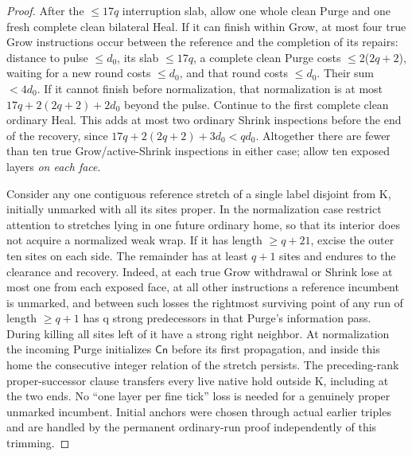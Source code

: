 \begin{proof}
After the \(\le\)\(17q\) interruption slab, allow one whole clean Purge and one fresh complete clean bilateral Heal. If it can finish within Grow, at most four true Grow instructions occur between the reference and the completion of its repairs: distance to pulse \(\le\)\(d_0\), its slab \(\le\)\(17q\), a complete clean Purge costs \(\le\)2(\(2q+2\)), waiting for a new round costs \(\le\)\(d_0\), and that round costs \(\le\)\(d_0\). Their sum \(<4d_0\). If it cannot finish before normalization, that normalization is at most \(17q+2(2q+2)+2d_0\) beyond the pulse. Continue to the first complete clean ordinary Heal. This adds at most two ordinary Shrink inspections before the end of the recovery, since \(17q+2(2q+2)+3d_0\)\(<qd_0\). Altogether there are fewer than ten true Grow/active-Shrink inspections in either case; allow ten exposed layers \emph{on each face}.

Consider any one contiguous reference stretch of a single label disjoint from K, initially unmarked with all its sites proper. In the normalization case restrict attention to stretches lying in one future ordinary home, so that its interior does not acquire a normalized weak wrap. If it has length \(\ge\)\(q+21\), excise the outer ten sites on each side. The remainder has at least \(q+1\) sites and endures to the clearance and recovery. Indeed, at each true Grow withdrawal or Shrink lose at most one from each exposed face, at all other instructions a reference incumbent is unmarked, and between such losses the rightmost surviving point of any run of length \(\ge\)\(q+1\) has q strong predecessors in that Purge's information pass. During killing all sites left of it have a strong right neighbor. At normalization the incoming Purge initializes \(\mathsf{Cn}\) before its first propagation, and inside this home the consecutive integer relation of the stretch persists. The preceding-rank proper-successor clause transfers every live native hold outside K, including at the two ends. No ``one layer per fine tick'' loss is needed for a genuinely proper unmarked incumbent. Initial anchors were chosen through actual earlier triples and are handled by the permanent ordinary-run proof independently of this trimming.


\end{proof}
